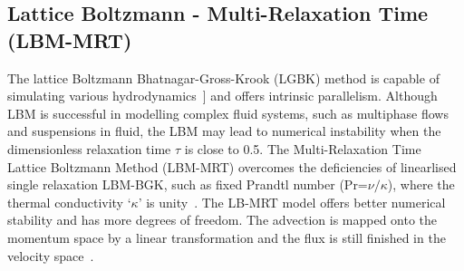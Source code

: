 \subsection{Lattice Boltzmann - Multi-Relaxation Time (LBM-MRT)}
The lattice Boltzmann Bhatnagar-Gross-Krook (LGBK) method is capable of simulating various hydrodynamics~\citep{Succi1989, Succi2001}] and offers intrinsic parallelism. Although LBM is successful in modelling complex fluid systems, such as multiphase flows and suspensions in fluid, the LBM may lead to numerical instability when the dimensionless relaxation time $\tau$ is close to 0.5. The Multi-Relaxation Time Lattice Boltzmann Method (LBM-MRT) overcomes the deficiencies of linearlised single relaxation LBM-BGK, such as fixed Prandtl number (Pr=$\nu/\kappa$), where the thermal conductivity `$\kappa$' is unity~\citep{Liu2003a}. The LB-MRT model offers better numerical stability and has more degrees of freedom. The advection is mapped onto the momentum space by a linear transformation and the flux is still finished in the velocity space~\citep{Du2006}.

